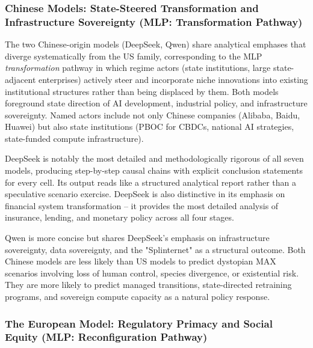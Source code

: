 \documentclass[preprint,review,12pt]{elsarticle}
\begin{document}
\subsubsection{Chinese Models: State-Steered Transformation and Infrastructure Sovereignty (MLP: Transformation Pathway)}
\label{sec:chinese_models}

The two Chinese-origin models (DeepSeek, Qwen) share analytical emphases that diverge systematically from the US family, corresponding to the MLP \textit{transformation} pathway in which regime actors (state institutions, large state-adjacent enterprises) actively steer and incorporate niche innovations into existing institutional structures rather than being displaced by them. Both models foreground state direction of AI development, industrial policy, and infrastructure sovereignty. Named actors include not only Chinese companies (Alibaba, Baidu, Huawei) but also state institutions (PBOC for CBDCs, national AI strategies, state-funded compute infrastructure).

DeepSeek is notably the most detailed and methodologically rigorous of all seven models, producing step-by-step causal chains with explicit conclusion statements for every cell. Its output reads like a structured analytical report rather than a speculative scenario exercise. DeepSeek is also distinctive in its emphasis on financial system transformation -- it provides the most detailed analysis of insurance, lending, and monetary policy across all four stages.

Qwen is more concise but shares DeepSeek's emphasis on infrastructure sovereignty, data sovereignty, and the "Splinternet" as a structural outcome. Both Chinese models are less likely than US models to predict dystopian MAX scenarios involving loss of human control, species divergence, or existential risk. They are more likely to predict managed transitions, state-directed retraining programs, and sovereign compute capacity as a natural policy response.


\subsubsection{The European Model: Regulatory Primacy and Social Equity (MLP: Reconfiguration Pathway)}
\label{sec:european_model}
\end{document}
